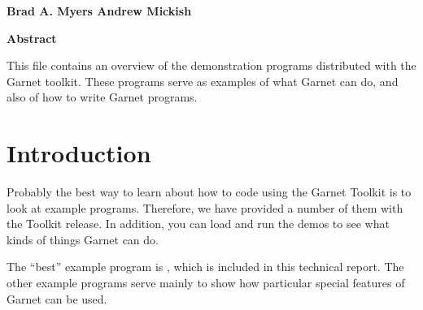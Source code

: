 \begin{titlepage}


\begin{titlebox}
\vspace{0.6 inch}

{\bf Brad A. Myers
Andrew Mickish}
\vspace{0.3 line}
\value{date}
\end{titlebox}
\vspace{0.5 inch}
\begin{center}
{\bf Abstract}\end{center}
\begin{text}
This file contains an overview of the demonstration programs distributed
with the Garnet toolkit.  These programs serve as examples of what Garnet
can do, and also of how to write Garnet programs.

\vspace{0.5 inch}

\end{text}
\end{titlepage}




\section{Introduction}
Probably the best way to learn about how to code using the Garnet
Toolkit is to look at example programs.  Therefore, we have provided a
number of them with the Toolkit release.  In addition, you can load and run
the demos to see what kinds of things Garnet can do.

The ``best'' example program is , which is included in this
technical report.  The other example programs serve mainly to show how
particular special features of Garnet can be used.

